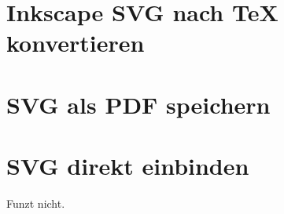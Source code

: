 \documentclass{scrartcl}
\begin{document}
\section{Inkscape SVG nach TeX konvertieren}


\section{SVG als PDF speichern}
\scalebox{0.6}{}


\section{SVG direkt einbinden}
Funzt nicht.
%
\end{document}
